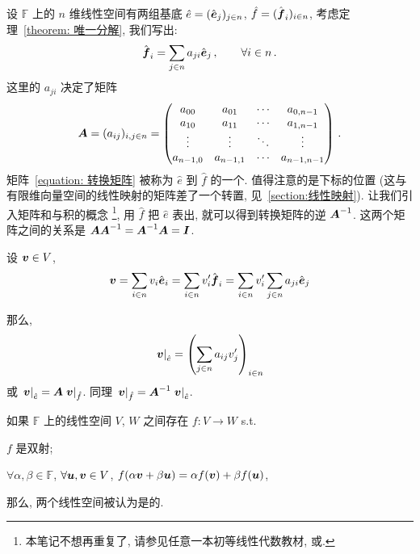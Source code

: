 \documentclass[openany, a5paper, oneside]{ctexbook}
\newcommand*{\inbasis}[2]{\left.%
	{#1}\right|_{#2}
}
\begin{document}
设 $\mathbb F$ 上的 $n$ 维线性空间有两组基底 $\hat e = (\hat{\boldsymbol{e}}_j)_{j \in n}$, $\hat f = (\hat{\boldsymbol{f}}_i)_{i \in n}$, 考虑定理~\ref{theorem: 唯一分解}, 我们写出:
\begin{equation}
	\hat{\boldsymbol{f}}_i = \sum_{j \in n} a_{ji} \hat{\boldsymbol{e}}_j\,,
	\qquad
	\forall i \in n\,.
\end{equation}
这里的 $a_{ji}$ 决定了矩阵
\begin{equation}\label{equation: 转换矩阵}
	\boldsymbol{A} = (a_{ij})_{i,j \in n} =
	\begin{pmatrix}
		a_{00} & a_{01} & \cdots & a_{0, n-1} \\
		a_{10} & a_{11} & \cdots & a_{1, n-1} \\
		\vdots & \vdots & \ddots & \vdots     \\
		a_{n-1, 0} & a_{n-1, 1} & \cdots & a_{n-1, n-1}
	\end{pmatrix}\,.
\end{equation}
矩阵~\eqref{equation: 转换矩阵} 被称为 $\hat e$ 到 $\hat f$ 的一个. 值得注意的是下标的位置 (这与有限维向量空间的线性映射的矩阵差了一个转置, 见~\ref{section:线性映射}). 让我们引入矩阵和与积的概念%
\footnote{本笔记不想再重复了, 请参见任意一本初等线性代数教材, 或\cite{kostrikin1982introduction}. },
用 $\hat f$ 把 $\hat e$ 表出, 就可以得到转换矩阵的逆 $\boldsymbol{A}^{-1}$. 
这两个矩阵之间的关系是 $\boldsymbol{A} \boldsymbol{A}^{-1} = \boldsymbol{A}^{-1} \boldsymbol{A} = \boldsymbol{I}$.

设 $\boldsymbol{v} \in V$, 
\begin{equation*}
	\boldsymbol{v} = \sum_{i \in n} v_i \hat{\boldsymbol{e}}_i
	= \sum_{i \in n} v'_i \hat{\boldsymbol{f}}_i
	= \sum_{i \in n} v'_i \sum_{j \in n} a_{ji} \hat{\boldsymbol{e}}_j
\end{equation*}

那么, 
\begin{equation*}
	\inbasis{\bv v}{\hat e} = \left( 
		\sum_{j \in n} a_{ij} v'_j 
 \right)_{i \in n}
\end{equation*}
或 $\inbasis{\bv v}{\hat e} = \bv A \inbasis{\bv v}{\hat f}$. 同理 $\inbasis{\bv v}{\hat f} = \bv A^{-1} \inbasis{\bv v}{\hat e}$. 

\begin{definition}[同构]
	如果 $\mathbb F$ 上的线性空间 $V$, $W$ 之间存在 $f \colon V \to W$ s.t.\ 
	\begin{conditionlist}
		\item $f$ 是双射;
		\item $\forall \alpha, \beta \in \mathbb F$, $\forall \boldsymbol{u}, \boldsymbol{v} \in V$, $f(\alpha \boldsymbol{v} + \beta \boldsymbol{u}) = \alpha f(\boldsymbol{v}) + \beta f(\boldsymbol{u})$,
	\end{conditionlist}
	那么, 两个线性空间被认为是的.
\end{definition}
\end{document}
